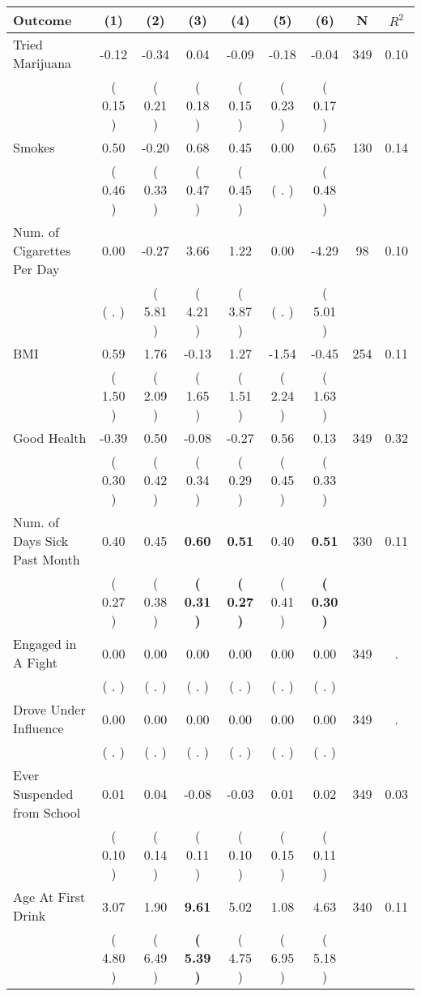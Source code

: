 \begin{tabular}{lcccccccc}
\toprule
 \textbf{Outcome} & \textbf{(1)} & \textbf{(2)} & \textbf{(3)} & \textbf{(4)} & \textbf{(5)} & \textbf{(6)} & \textbf{N} & \textbf{$ R^2$} \\
\midrule
Tried Marijuana &     -0.12 &     -0.34 &      0.04 &     -0.09 &     -0.18 &     -0.04 & 349 &       0.10 \\ 
 & (     0.15 ) & (     0.21 ) & (     0.18 ) & (     0.15 ) & (     0.23 ) & (     0.17 ) & \\
Smokes &      0.50 &     -0.20 &      0.68 &      0.45 &      0.00 &      0.65 & 130 &       0.14 \\ 
 & (     0.46 ) & (     0.33 ) & (     0.47 ) & (     0.45 ) & (        . ) & (     0.48 ) & \\
Num. of Cigarettes Per Day &      0.00 &     -0.27 &      3.66 &      1.22 &      0.00 &     -4.29 & 98 &       0.10 \\ 
 & (        . ) & (     5.81 ) & (     4.21 ) & (     3.87 ) & (        . ) & (     5.01 ) & \\
BMI &      0.59 &      1.76 &     -0.13 &      1.27 &     -1.54 &     -0.45 & 254 &       0.11 \\ 
 & (     1.50 ) & (     2.09 ) & (     1.65 ) & (     1.51 ) & (     2.24 ) & (     1.63 ) & \\
Good Health &     -0.39 &      0.50 &     -0.08 &     -0.27 &      0.56 &      0.13 & 349 &       0.32 \\ 
 & (     0.30 ) & (     0.42 ) & (     0.34 ) & (     0.29 ) & (     0.45 ) & (     0.33 ) & \\
Num. of Days Sick Past Month &      0.40 &      0.45 & \textbf{     0.60} & \textbf{     0.51} &      0.40 & \textbf{     0.51} & 330 &       0.11 \\ 
 & (     0.27 ) & (     0.38 ) & \textbf{(     0.31 )} & \textbf{(     0.27 )} & (     0.41 ) & \textbf{(     0.30 )} & \\
Engaged in A Fight &      0.00 &      0.00 &      0.00 &      0.00 &      0.00 &      0.00 & 349 &          . \\ 
 & (        . ) & (        . ) & (        . ) & (        . ) & (        . ) & (        . ) & \\
Drove Under Influence &      0.00 &      0.00 &      0.00 &      0.00 &      0.00 &      0.00 & 349 &          . \\ 
 & (        . ) & (        . ) & (        . ) & (        . ) & (        . ) & (        . ) & \\
Ever Suspended from School &      0.01 &      0.04 &     -0.08 &     -0.03 &      0.01 &      0.02 & 349 &       0.03 \\ 
 & (     0.10 ) & (     0.14 ) & (     0.11 ) & (     0.10 ) & (     0.15 ) & (     0.11 ) & \\
Age At First Drink &      3.07 &      1.90 & \textbf{     9.61} &      5.02 &      1.08 &      4.63 & 340 &       0.11 \\ 
 & (     4.80 ) & (     6.49 ) & \textbf{(     5.39 )} & (     4.75 ) & (     6.95 ) & (     5.18 ) & \\
\bottomrule
\end{tabular}
